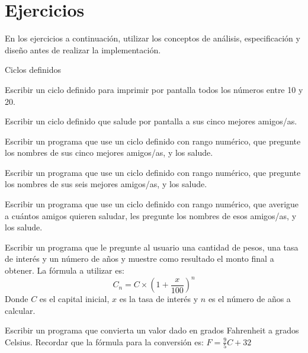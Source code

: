 \newpage
\section{Ejercicios}

\begin{extract*}
En los ejercicios a continuación, utilizar los conceptos de análisis,
especificación y diseño antes de realizar la implementación.
\end{extract*}

\begin{ejercicio} Ciclos definidos
\begin{partes}
	\item Escribir un ciclo definido para imprimir por pantalla
todos los números entre 10 y 20.
	\item Escribir un ciclo definido que salude por pantalla a
sus cinco mejores amigos/as.
	\item Escribir un programa que use un ciclo definido con
rango numérico, que pregunte los nombres de sus cinco mejores
amigos/as, y los salude.
	\item Escribir un programa que use un ciclo definido con
rango numérico, que pregunte los nombres de sus seis mejores
amigos/as, y los salude.
	\item Escribir un programa que use un ciclo definido con
rango numérico, que averigue a cuántos amigos quieren saludar, les
pregunte los nombres de esos amigos/as, y los salude.
\end{partes}
\end{ejercicio}

\begin{ejercicio}
Escribir un programa que le pregunte al usuario una cantidad de pesos,
una tasa de interés y un número de años y muestre como resultado el monto
final a obtener.  La fórmula a utilizar es:
\begin{displaymath}
C_n = C \times (1+\frac{x}{100})^n
\end{displaymath}
Donde $C$ es el capital inicial, $x$ es la tasa de interés y $n$ es el
número de años a calcular.
\end{ejercicio}

\begin{ejercicio}
Escribir un programa que convierta un valor dado en grados Fahrenheit a
grados Celsius.  Recordar que la fórmula para la conversión es:
$F = \frac{9}{5}C+32$
\end{ejercicio}

